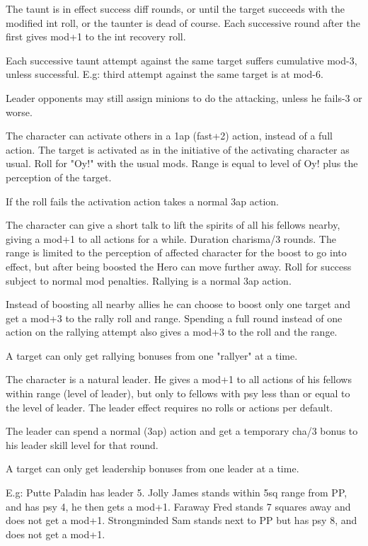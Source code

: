 The taunt is in effect success diff rounds, or until the target succeeds with the modified int roll, or the taunter is dead of course. Each successive round after the first gives mod+1 to the int recovery roll.

Each successive taunt attempt against the same target suffers cumulative mod-3, unless successful. E.g: third attempt against the same target is at mod-6.

Leader opponents may still assign minions to do the attacking, unless he fails-3 or worse.


 The character can activate others in a 1ap (fast+2) action, instead of a full action. The target is activated as in the initiative of the activating character as usual.
Roll for "Oy!" with the usual mods. Range is equal to level of Oy! plus the perception of the target.

If the roll fails the activation action takes a normal 3ap action.


 The character can give a short talk to lift the spirits of all his fellows nearby, giving a mod+1 to all actions for a while. Duration charisma/3 rounds. The range is limited to the perception of affected character for the boost to go into effect, but after being boosted the Hero can move further away. Roll for success subject to normal mod penalties. Rallying is a normal 3ap action.

Instead of boosting all nearby allies he can choose to boost only one target and get a mod+3 to the rally roll and range. Spending a full round instead of one action on the rallying attempt also gives a mod+3 to the roll and the range.

A target can only get rallying bonuses from one "rallyer" at a time.


 The character is a natural leader. He gives a mod+1 to all actions of his fellows within range (level of leader), but only to fellows with psy less than or equal to the level of leader. The leader effect requires no rolls or actions per default.

The leader can spend a normal (3ap) action and get a temporary cha/3 bonus to his leader skill level for that round.

A target can only get leadership bonuses from one leader at a time.

E.g: Putte Paladin has leader 5. Jolly James stands within 5sq range from PP, and has psy 4, he then gets a mod+1. Faraway Fred stands 7 squares away and does not get a mod+1. Strongminded Sam stands next to PP but has psy 8, and does not get a mod+1.

